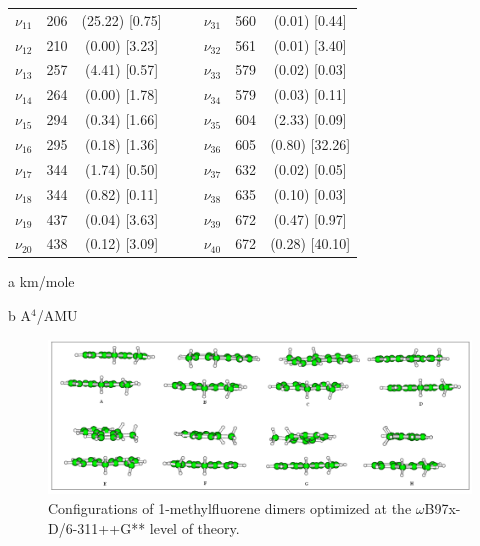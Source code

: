 \begin{table}[H]
\begin{center}
\begin{threeparttable}
\begin{tabular}{c c c c c c c c}
$\nu_{11}$ & 206 & (25.22) [0.75] & & & $\nu_{31}$& 560 & (0.01) [0.44]\\
$\nu_{12}$ & 210 & (0.00) [3.23] & & & $\nu_{32}$& 561 & (0.01) [3.40]\\
$\nu_{13}$ & 257& (4.41) [0.57] & & & $\nu_{33}$& 579 & (0.02) [0.03]\\
$\nu_{14}$ & 264 & (0.00) [1.78] & & & $\nu_{34}$&579 & (0.03) [0.11]\\
$\nu_{15}$ & 294 & (0.34) [1.66] & & & $\nu_{35}$& 604& (2.33) [0.09]\\
$\nu_{16}$ & 295 & (0.18) [1.36] & & & $\nu_{36}$&605 & (0.80) [32.26]\\
$\nu_{17}$ & 344& (1.74) [0.50] & & & $\nu_{37}$&632 & (0.02) [0.05] \\
$\nu_{18}$ & 344& (0.82) [0.11] & & & $\nu_{38}$& 635 & (0.10) [0.03]\\
$\nu_{19}$ & 437 & (0.04) [3.63] & & & $\nu_{39}$&672 & (0.47) [0.97] \\
$\nu_{20}$ & 438 & (0.12) [3.09] & & & $\nu_{40}$&672 & (0.28) [40.10]\\
 	\bottomrule
\end{tabular}

\begin{tablenotes}
	\item[a] km/mole
	\item[b] A$^{4}$/AMU
\end{tablenotes}
\end{threeparttable}
\end{center}
\label{lowfreq-CyclopentaDi}
\end{table}	





\begin{figure}[H]
	\begin{center}
		\includegraphics[scale=0.9]{image/1MCC}
	\end{center}
	\caption{ Configurations of 1-methylfluorene dimers optimized at the $\omega$B97x-D/6-311++G** level of theory. }
\end{figure}


